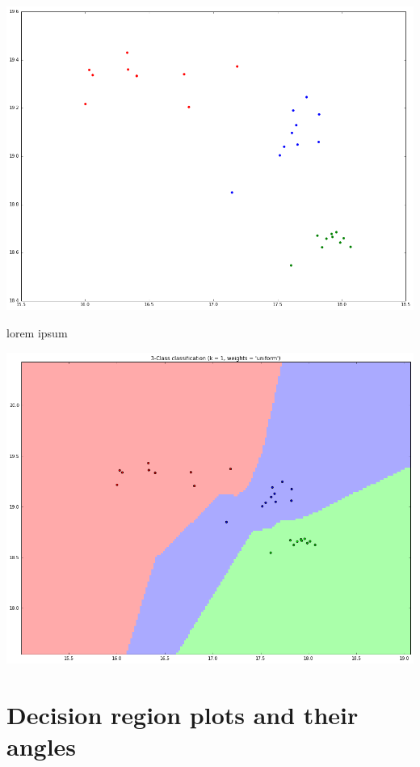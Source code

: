 \documentclass[12px]{article}
\begin{document}
\begin{flushleft}
    \includegraphics[scale=0.25]{clusters}

    lorem ipsum

    \includegraphics[scale=0.25]{decision}


\section{Decision region plots and their angles}

\end{flushleft}
\end{document}
